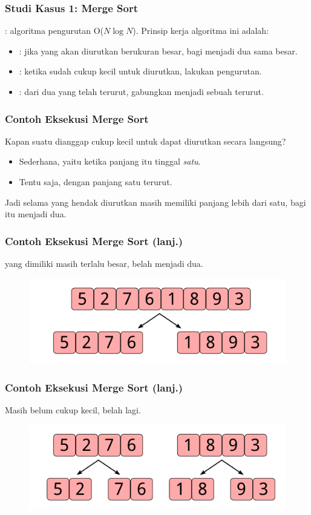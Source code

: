 \begin{frame}
\frametitle{Studi Kasus 1: Merge Sort}
\newTerm{\fMergeSort}: algoritma pengurutan O($N \log{N}$).
\newline
\newline
Prinsip kerja algoritma ini adalah:
\begin{itemize}
  \item {}: jika \farray yang akan diurutkan berukuran besar, bagi menjadi dua \farray sama besar.
  \item {}: ketika \farray sudah cukup kecil untuk diurutkan, lakukan pengurutan.
  \item {}: dari dua \farray yang telah terurut, gabungkan menjadi sebuah \farray terurut.
\end{itemize}
\end{frame}

\begin{frame}
\frametitle{Contoh Eksekusi Merge Sort}
Kapan suatu \farray dianggap cukup kecil untuk dapat diurutkan secara langsung?
\newline
\begin{itemize}
  \item Sederhana, yaitu ketika panjang \farray itu tinggal \emph{satu}.
  \item Tentu saja, \farray dengan panjang satu  terurut.
  \newline
\end{itemize}
Jadi selama \farray yang hendak diurutkan masih memiliki panjang lebih dari satu, bagi \farray itu menjadi dua.
\end{frame}

\begin{frame}
\frametitle{Contoh Eksekusi Merge Sort (lanj.)}
\fArray yang dimiliki masih terlalu besar, belah menjadi dua.
\begin{figure}
  \centering
  \includegraphics[width=10 cm]{asset/merge-sort-demo-1.pdf}
\end{figure}
\end{frame}

\begin{frame}
\frametitle{Contoh Eksekusi Merge Sort (lanj.)}
Masih belum cukup kecil, belah lagi.
\begin{figure}
  \centering
  \includegraphics[width=10 cm]{asset/merge-sort-demo-2.pdf}
\end{figure}
\end{frame}

